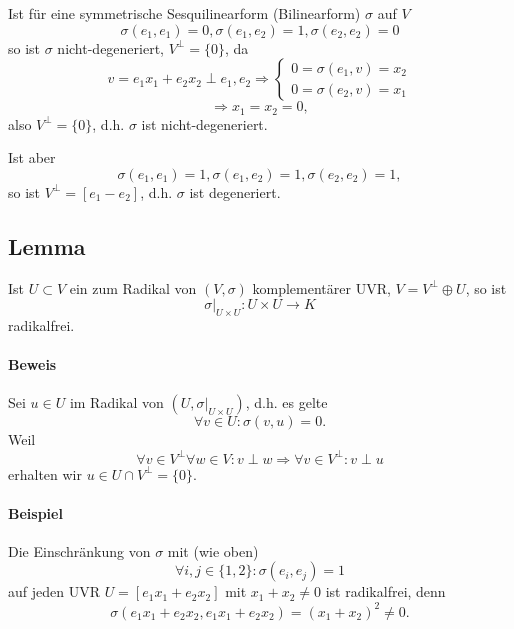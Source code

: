 	Ist für eine symmetrische Sesquilinearform (Bilinearform) $ \sigma $ auf $ V $
		\[ \sigma(e_1,e_1) = 0, \sigma(e_1,e_2) = 1, \sigma(e_2,e_2) = 0 \]
	so ist $ \sigma $ nicht-degeneriert, $ V^\perp = \{0\} $, da
		\[ v = e_1x_1 + e_2x_2 \perp e_1,e_2 \Rightarrow
		\begin{cases}
		0 = \sigma(e_1,v) = x_2\\
		0 = \sigma(e_2,v) = x_1
		\end{cases} \]
		\[ \Rightarrow x_1 = x_2 = 0, \]
	also $ V^\perp = \{0\} $, d.h. $ \sigma $ ist nicht-degeneriert.
	
	
	Ist aber
		\[ \sigma(e_1,e_1) = 1, \sigma(e_1,e_2) = 1, \sigma(e_2,e_2) = 1, \]
	so ist $ V^\perp = [e_1-e_2] $, d.h. $ \sigma $ ist degeneriert.
	

\subsection{Lemma}
\begin{Lemma}[]
	Ist $ U\subset V $ ein zum Radikal von $ (V,\sigma) $ komplementärer UVR, $ V = V^\perp \oplus U $, so ist
		\[ \sigma\big|_{U\times U}:U\times U \to K \]
	radikalfrei.
\end{Lemma}
\paragraph{Beweis}
	Sei $ u\in U $ im Radikal von $ (U,\sigma\big|_{U\times U}) $, d.h. es gelte
		\[ \forall v\in U: \sigma(v,u) = 0. \]
	Weil
		\[ \forall v\in V^\perp\forall w\in V: v\perp w \Rightarrow \forall v\in V^\perp: v\perp u \]
	erhalten wir $ u\in U\cap V^\perp = \{0\} $.
\paragraph{Beispiel}
	Die Einschränkung von $ \sigma $ mit (wie oben)
		\[ \forall i,j \in \{1,2\}: \sigma(e_i,e_j) = 1 \]
		auf jeden UVR $ U = [e_1x_1 + e_2x_2] $ mit $ x_1 + x_2 \neq 0 $ ist radikalfrei, denn
			\[ \sigma(e_1x_1+e_2x_2, e_1x_1+e_2x_2) = (x_1+x_2)^2 \neq 0. \]